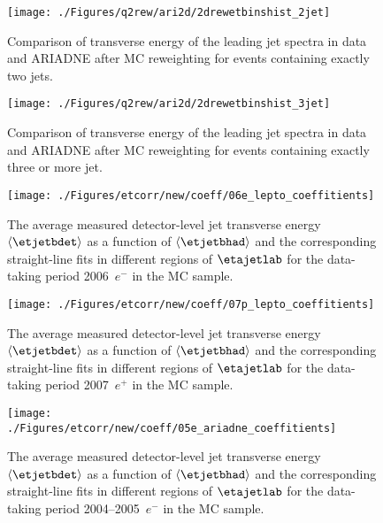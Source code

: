 \begin{figure}[p]%
\texttt{[image: ./Figures/q2rew/ari2d/2drewetbinshist\_2jet]}%
\caption{Comparison of transverse energy of the leading jet spectra in data
and ARIADNE after MC reweighting for events containing exactly two jets.}%
\label{fig:2dq2rew_et_2jet}%
\end{figure}

\begin{figure}[p]%
\texttt{[image: ./Figures/q2rew/ari2d/2drewetbinshist\_3jet]}%
\caption{Comparison of transverse energy of the leading jet spectra in data
and ARIADNE after MC reweighting for events containing exactly three or more jet.}%
\label{fig:2dq2rew_et_3jet}%
\end{figure}

\begin{figure}[p]
\centering
\texttt{[image: ./Figures/etcorr/new/coeff/06e\_lepto\_coeffitients]}
\caption{The average measured detector-level jet transverse energy $\left\langle\etjetbdet\right\rangle$ as a function of $\left\langle\etjetbhad\right\rangle$ and the corresponding straight-line fits in different regions of $\etajetlab$ for the data-taking period 2006~$e^-$ in the \lepto MC sample.}
\label{fig:05e_lepto_coeffitients}
\end{figure}

\begin{figure}[p]
\centering
\texttt{[image: ./Figures/etcorr/new/coeff/07p\_lepto\_coeffitients]}
\caption{The average measured detector-level jet transverse energy $\left\langle\etjetbdet\right\rangle$ as a function of $\left\langle\etjetbhad\right\rangle$ and the corresponding straight-line fits in different regions of $\etajetlab$ for the data-taking period 2007~$e^+$ in the \lepto MC sample.}
\label{fig:05e_lepto_coeffitients}
\end{figure}

\begin{figure}[p]
\centering
\texttt{[image: ./Figures/etcorr/new/coeff/05e\_ariadne\_coeffitients]}
\caption{The average measured detector-level jet transverse energy $\left\langle\etjetbdet\right\rangle$ as a function of $\left\langle\etjetbhad\right\rangle$ and the corresponding straight-line fits in different regions of $\etajetlab$ for the data-taking period 2004--2005~$e^-$ in the \ariadne MC sample.}
\label{fig:05e_lepto_coeffitients}
\end{figure}


